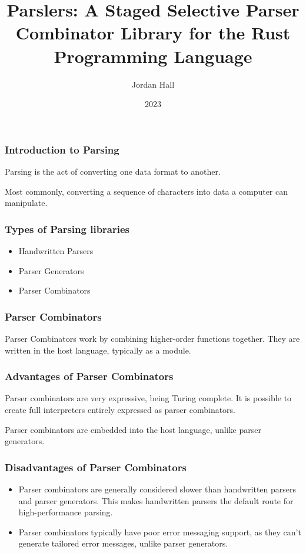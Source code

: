 \documentclass{slides}
\title{Parslers: A Staged Selective Parser Combinator Library for the Rust Programming Language}
\author{Jordan Hall}
\institute{Imperial Computing (BEng) Final Year Project Presentation}
\date{2023}
\begin{document}
\frame{\titlepage}

\begin{frame}
\frametitle{Introduction to Parsing}
Parsing is the act of converting one data format to another.

Most commonly, converting a sequence of characters into data a computer can manipulate.

\end{frame}

\begin{frame}
\frametitle{Types of Parsing libraries}

\begin{itemize}
    
    \item Handwritten Parsers

    \item Parser Generators

    \item Parser Combinators
\end{itemize}

\end{frame}


\begin{frame}
\frametitle{Parser Combinators}

Parser Combinators work by combining higher-order functions together. They are written in the host language, typically as a module.

\end{frame}

\begin{frame}
\frametitle{Advantages of Parser Combinators}

Parser combinators are very expressive, being Turing complete. It is possible to create full interpreters entirely expressed as parser combinators. 

Parser combinators are embedded into the host language, unlike parser generators.

\end{frame}

\begin{frame}
\frametitle{Disadvantages of Parser Combinators}

\begin{itemize}
    \item Parser combinators are generally considered slower than handwritten parsers and parser generators. This makes handwritten parsers the default route for high-performance parsing.

    \item Parser combinators typically have poor error messaging support, as they can't generate tailored error messages, unlike parser generators.
\end{itemize}

\end{frame}
\end{document}

